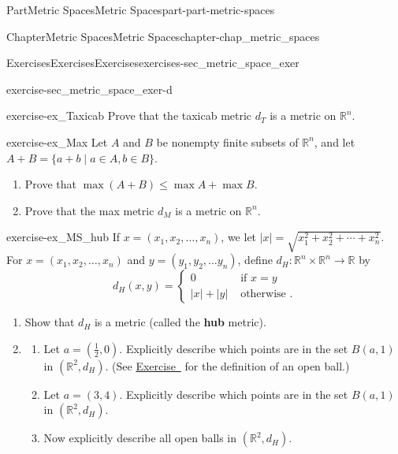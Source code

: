\documentclass[oneside,10pt,]{book}
\newcommand{\xreffont}{\relax}
\newcommand{\terminology}[1]{\textbf{#1}}
\numberwithin{equation}{chapter}
\newcommand{\R}{\mathbb{R}}
\newcommand{\amp}{&}
\begin{document}
\begin{partptx}{Part}{Metric Spaces}{}{Metric Spaces}{}{}{part-part-metric-spaces}
\begin{chapterptx}{Chapter}{Metric Spaces}{}{Metric Spaces}{}{}{chapter-chap_metric_spaces}
\begin{exercises-section}{Exercises}{Exercises}{}{Exercises}{}{}{exercises-sec_metric_space_exer}
\begin{divisionexercise}{4}{}{}{exercise-sec_metric_space_exer-d}
\end{divisionexercise}%
\begin{divisionexercise}{5}{}{}{exercise-ex_Taxicab}%
Prove that the taxicab metric \(d_T\) is a metric on \(\R^n\).%
\end{divisionexercise}%
\begin{divisionexercise}{6}{}{}{exercise-ex_Max}%
Let \(A\) and \(B\) be nonempty finite subsets of \(\R^n\), and let \(A+B = \{a+b \mid a \in A, b \in B\}\).%
\begin{enumerate}[font=\bfseries,label=(\alph*),ref=\alph*]%
\item{}Prove that \(\max (A+B) \leq \max A + \max B\).%
\item{}Prove that the max metric \(d_M\) is a metric on \(\R^n\).%
\end{enumerate}%
\end{divisionexercise}%
\begin{divisionexercise}{7}{}{}{exercise-ex_MS_hub}%
If \(x = (x_1, x_2, \ldots, x_n)\), we let \(|x| = \sqrt{x_1^2+x_2^2+ \cdots + x_n^2}\). For \(x = (x_1, x_2, \ldots,
x_n)\) and \(y = (y_1, y_2, \ldots y_n)\), define \(d_H: \R^n \times \R^n \to \R\) by%
\begin{equation*}
d_H(x,y) = \begin{cases}0 \amp \text{ if }  x=y \\ |x|+|y| \amp \text{ otherwise } . \end{cases}
\end{equation*}
%
\begin{enumerate}[font=\bfseries,label=(\alph*),ref=\alph*]%
\item{}Show that \(d_H\) is a metric (called the \terminology{hub} metric).%
\item{}\begin{enumerate}[font=\bfseries,label=(\roman*),ref=\theenumi.\roman*]%
\item{}Let \(a = \left(\frac{1}{2}, 0\right)\). Explicitly describe which points are in the set \(B(a,1)\) in \((\R^2, d_H)\). (See \hyperlink{exercise-ex_MS_mod_metric}{Exercise~{\xreffont 2}} for the definition of an open ball.)%
\item{}Let \(a = (3,4)\). Explicitly describe which points are in the set \(B(a,1)\) in \((\R^2, d_H)\).%
\item{}Now explicitly describe all open balls in \((\R^2, d_H)\).%
\end{enumerate}%
\end{enumerate}%
\end{divisionexercise}%

\end{exercises-section}
\end{chapterptx}
\end{partptx}
\end{document}
